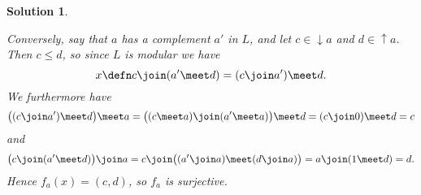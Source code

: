 \documentclass[article, a4paper, 11pt, oneside]{memoir}
\numberwithin{equation}{chapter}
\theoremstyle{nonumberplain}
\newtheorem{solution}{Solution}
\newcommand{\upset}{\operatorname{\uparrow}}
\newcommand{\downset}{\operatorname{\downarrow}}
\begin{document}
\begin{solution}
\begin{solutionsec}
    Conversely, say that $a$ has a complement $a'$ in $L$, and let $c \in \downset a$ and $d \in \upset a$. Then $c \leq d$, so since $L$ is modular we have
    \begin{equation*}
        x
            \defn c \join (a' \meet d)
            = (c \join a') \meet d.
    \end{equation*}
    We furthermore have
    \begin{equation*}
        \bigl( (c \join a') \meet d \bigr) \meet a
            = \bigl( (c \meet a) \join (a' \meet a) \bigr) \meet d
            = (c \join 0) \meet d
            = c
    \end{equation*}
    and
    \begin{equation*}
        \bigl( c \join (a' \meet d ) \bigr) \join a
            = c \join \bigl( (a' \join a) \meet (d \join a) \bigr)
            = a \join (1 \meet d)
            = d.
    \end{equation*}
    Hence $f_a(x) = (c,d)$, so $f_a$ is surjective.
\end{solutionsec}
\end{solution}
\end{document}
